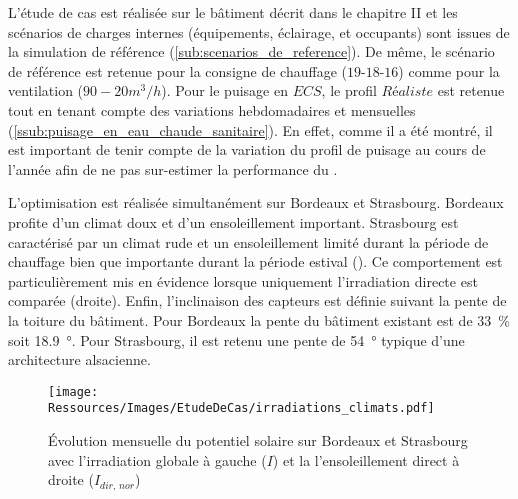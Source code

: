 L’étude de cas est réalisée sur le bâtiment décrit dans le chapitre II et les scénarios de
charges internes (équipements, éclairage, et occupants) sont issues de la simulation de
référence (\ref{sub:scenarios_de_reference}). De même, le scénario de référence est
retenue pour la consigne de chauffage ($19$-$18$-$16$) comme pour la ventilation
($90-20 \si{m^{3}\per h}$). Pour le puisage en $ECS$, le profil $Réaliste$ est retenue tout en tenant
compte des variations hebdomadaires et mensuelles
(\ref{ssub:puisage_en_eau_chaude_sanitaire}). En effet, comme il a été montré, il est
important de tenir compte de la variation du profil de puisage au cours de l’année afin de
ne pas sur-estimer la performance du .

L’optimisation est réalisée simultanément sur Bordeaux et Strasbourg. Bordeaux profite
d’un climat doux et d’un ensoleillement important. Strasbourg est caractérisé par un
climat rude et un ensoleillement limité durant la période de chauffage bien que importante
durant la période estival (). Ce comportement
est particulièrement mis en évidence lorsque uniquement l’irradiation directe est comparée
(droite). Enfin, l’inclinaison des capteurs est définie suivant la pente de la toiture du
bâtiment. Pour Bordeaux la pente du bâtiment existant est de \SI{33}{\percent} soit
\SI{18.9}{\degree}. Pour Strasbourg, il est retenu une pente de \SI{54}{\degree} typique
d’une architecture alsacienne.

\begin{figure}
    \centering
    \texttt{[image: Ressources/Images/EtudeDeCas/irradiations\_climats.pdf]}
    \caption[Évolution mensuelle du potentiel solaire sur Bordeaux et Strasbourg]
            {Évolution mensuelle du potentiel solaire sur Bordeaux et Strasbourg avec l’irradiation
            globale à gauche ($I$) et la l’ensoleillement direct à droite ($I_{dir,\,nor}$)}
    \label{fig:diff_ensoleillement_bor_stras}
\end{figure}


